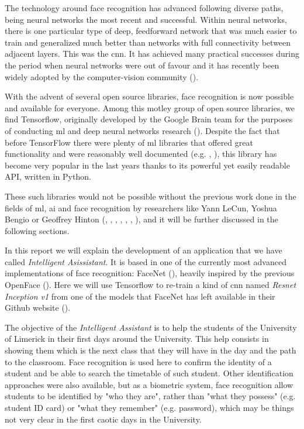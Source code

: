 The technology around face recognition has advanced following diverse paths, being neural networks the most recent and successful. Within neural networks, there is one particular type of deep, feedforward network that was much easier to train and generalized much better than networks with full connectivity between adjacent layers. This was the \gls{cnn}. It has achieved many practical successes during the period when neural networks were out of favour and it has recently been widely adopted by the computer-vision community (\cite{lecun2015deep}). 

With the advent of several open source libraries, face recognition is now possible and available for everyone. Among this motley group of open source libraries, we find Tensorflow, originally developed by the Google Brain team for the purposes of conducting \gls{ml} and deep neural networks research (\cite{tensorflow_main_website}). Despite the fact that before TensorFlow there were plenty of \gls{ml} libraries that offered great functionality and were reasonably well documented (e.g. \cite{theano_main_site}, \cite{caffe_main_site}), this library has become very popular in the last years thanks to its powerful yet easily readable API, written in Python. 

These such libraries would not be possible without the previous work done in the fields of \gls{ml}, \gls{ai} and face recognition by researchers like Yann LeCun, Yoshua Bengio or Geoffrey Hinton (\cite{rumelhart1985learning}, \cite{lecun1995convolutional}, \cite{lecun1998efficient}, \cite{lecun1998gradient}, \cite{bengio2009learning}, \cite{krizhevsky2012deep}, \cite{lecun2015deep}), and it will be further discussed in the following sections.

In this report we will explain the development of an application that we have called \textit{Intelligent Asissistant}. It is based in one of the currently most advanced implementations of face recognition: FaceNet (\cite{facenet_article}), heavily inspired by the previous OpenFace (\cite{amos2016openface}). Here we will use Tensorflow to re-train a kind of \gls{cnn} named \textit{Resnet Inception v1} from one of the models that FaceNet has left available in their Github website (\cite{facenet_github}).

The objective of the \textit{Intelligent Assistant} is to help the students of the University of Limerick in their first days around the University. This help consists in showing them which is the next class that they will have in the day and the path to the classroom. Face recognition is used here to confirm the identity of a student and be able to search the timetable of such student. Other identification approaches were also available, but as a biometric system, face recognition allow students to be identified by "who they are", rather than "what they possess" (e.g. student ID card) or "what they remember" (e.g. password), which may be things not very clear in the first caotic days in the University. 


